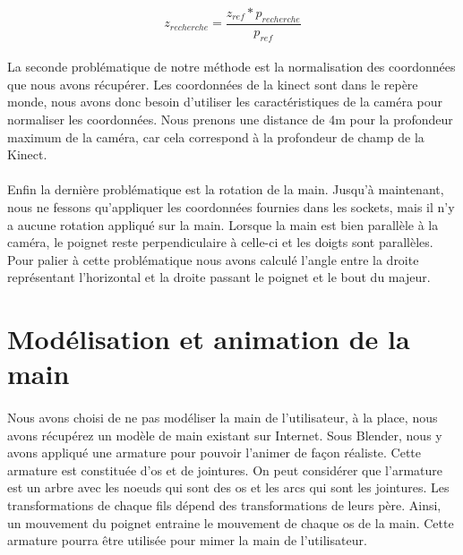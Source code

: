 \begin{equation}
 z_{recherche} = \frac{z_{ref} * p_{recherche}}{p_{ref}}
\end{equation}

\paragraph{}
La seconde problématique de notre méthode est la normalisation des coordonnées que nous avons récupérer. Les coordonnées
de la kinect sont dans le repère monde, nous avons donc besoin d'utiliser les caractéristiques de la caméra pour normaliser
les coordonnées. Nous prenons une distance de 4m pour la profondeur maximum de la caméra, car cela correspond à la profondeur 
de champ de la Kinect.

\paragraph{}
Enfin la dernière problématique est la rotation de la main. Jusqu'à maintenant, nous ne fessons qu'appliquer les coordonnées
fournies dans les sockets, mais il n'y a aucune rotation appliqué sur la main. Lorsque la main est bien parallèle à la caméra,
le poignet reste perpendiculaire à celle-ci et les doigts sont parallèles. Pour palier à cette problématique nous avons calculé
l'angle entre la droite représentant l'horizontal et la droite passant le poignet et le bout du majeur.



\section{Modélisation et animation de la main}
\paragraph{}
Nous avons choisi de ne pas modéliser la main de l'utilisateur, à la place, nous avons récupérez un modèle de main existant sur Internet.
Sous Blender, nous y avons appliqué une armature pour pouvoir l'animer de façon réaliste. Cette armature est constituée d'os et de jointures. On peut considérer que l'armature est 
un arbre avec les noeuds qui sont des os et les arcs qui sont les jointures. Les transformations de chaque fils dépend des transformations de leurs père. Ainsi, un mouvement du poignet 
entraine le mouvement de chaque os de la main. Cette armature pourra être utilisée pour mimer la main de l'utilisateur. 

